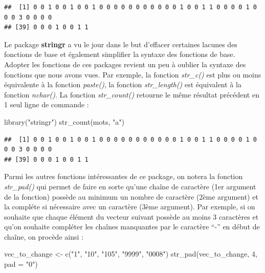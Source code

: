 \documentclass[
]{book}
\newenvironment{Shaded}{\begin{snugshade}}{\end{snugshade}}
\newcommand{\AttributeTok}[1]{\textcolor[rgb]{0.77,0.63,0.00}{#1}}
\newcommand{\DecValTok}[1]{\textcolor[rgb]{0.00,0.00,0.81}{#1}}
\newcommand{\FunctionTok}[1]{\textcolor[rgb]{0.00,0.00,0.00}{#1}}
\newcommand{\NormalTok}[1]{#1}
\newcommand{\OtherTok}[1]{\textcolor[rgb]{0.56,0.35,0.01}{#1}}
\newcommand{\StringTok}[1]{\textcolor[rgb]{0.31,0.60,0.02}{#1}}
\theoremstyle{definition}
\theoremstyle{definition}
\theoremstyle{definition}
\theoremstyle{definition}
\theoremstyle{remark}
\begin{document}
\begin{verbatim}
##  [1] 0 0 1 0 0 1 0 0 1 0 0 0 0 0 0 0 0 0 0 0 1 0 0 1 1 0 0 0 0 1 0 0 0 3 0 0 0 0
## [39] 0 0 0 1 0 0 1 1
\end{verbatim}

Le package \textbf{stringr} a vu le jour dans le but d'effacer certaines lacunes des fonctions de base et également simplifier la syntaxe des fonctions de base. Adopter les fonctions de ces packages revient un peu à oublier la syntaxe des fonctions que nous avons vues. Par exemple, la fonction \emph{str\_c()} est plus ou moins équivalente à la fonction \emph{paste()}, la fonction \emph{str\_length()} est équivalent à la fonction \emph{nchar()}. La fonction \emph{str\_count()} retourne le même résultat précédent en 1 seul ligne de commande :

\begin{Shaded}
\begin{Highlighting}[]
\FunctionTok{library}\NormalTok{(}\StringTok{"stringr"}\NormalTok{)}
\FunctionTok{str\_count}\NormalTok{(mots, }\StringTok{"a"}\NormalTok{)}
\end{Highlighting}
\end{Shaded}

\begin{verbatim}
##  [1] 0 0 1 0 0 1 0 0 1 0 0 0 0 0 0 0 0 0 0 0 1 0 0 1 1 0 0 0 0 1 0 0 0 3 0 0 0 0
## [39] 0 0 0 1 0 0 1 1
\end{verbatim}

Parmi les autres fonctions intéressantes de ce package, on notera la fonction \emph{str\_pad()} qui permet de faire en sorte qu'une chaîne de caractère (1er argument de la fonction) possède au minimum un nombre de caractère (2ème argument) et la compléte si nécessaire avec un caractère (3ème argument). Par exemple, si on souhaite que chaque élément du vecteur suivant possède au moins 3 caractères et qu'on souhaite compléter les chaînes manquantes par le caractère ``-'' en début de chaîne, on procède ainsi :

\begin{Shaded}
\begin{Highlighting}[]
\NormalTok{vec\_to\_change }\OtherTok{\textless{}{-}} \FunctionTok{c}\NormalTok{(}\StringTok{"1"}\NormalTok{, }\StringTok{"10"}\NormalTok{, }\StringTok{"105"}\NormalTok{, }\StringTok{"9999"}\NormalTok{, }\StringTok{"0008"}\NormalTok{)}
\FunctionTok{str\_pad}\NormalTok{(vec\_to\_change, }\DecValTok{4}\NormalTok{, }\AttributeTok{pad =} \StringTok{"0"}\NormalTok{)}
\end{Highlighting}
\end{Shaded}
\end{document}
